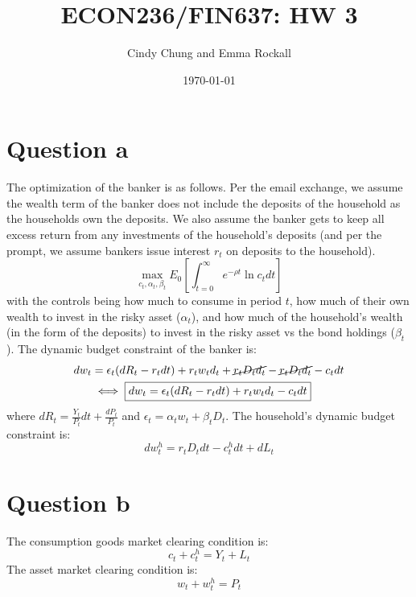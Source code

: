 \documentclass{article}
\title{ECON236/FIN637: HW 3}
\author{Cindy Chung and Emma Rockall}
\date{\today}
\begin{document}
\maketitle

\section*{Question a}
The optimization of the banker is as follows. Per the email exchange, we assume the wealth term of the banker does not include the deposits of the household as the households own the deposits. We also assume the banker gets to keep all excess return from any investments of the household's deposits (and per the prompt, we assume bankers issue interest $r_t$ on deposits to the household).
\[
\max_{c_t, \alpha_t, \beta_t} E_{0}\left[\int_{t=0}^{\infty} e^{-\rho t} \ln c_{t} d t\right]
\]
with the controls being how much to consume in period $t$, how much of their own wealth to invest in the risky asset ($\alpha_t$), and how much of the household's wealth (in the form of the deposits) to invest in the risky asset vs the bond holdings ($\beta_t$). The dynamic budget constraint of the banker is:
\[ \begin{aligned}
    d w_t &= \epsilon_t (d R_t - r_t d t)  + r_t w_t d_t + \cancel{r_t D_t d_t} - \cancel{r_t D_t d_t} - c_t d t \\
    & \iff \boxed{d w_t= \epsilon_t (d R_t - r_t d t)  + r_t w_t d_t - c_t d t }
\end{aligned} \]
where $\boxed{d R_t = \frac{Y_t}{P_t} d t + \frac{d P_t}{P_t}}$ and $\boxed{\epsilon_t = \alpha_tw_t + \beta_tD_t}$.
The household's dynamic budget constraint is:
\[
\boxed{d w_t^h = r_t D_t d t  - c_t^h d t + d L_t}  
\]
\section*{Question b}
The consumption goods market clearing condition is:
\[
\boxed{c_t + c_t^h = Y_t + L_t    }
\]
The asset market clearing condition is:
\[
\boxed{w_t + w_t^h = P_t    }
\]
\end{document}
